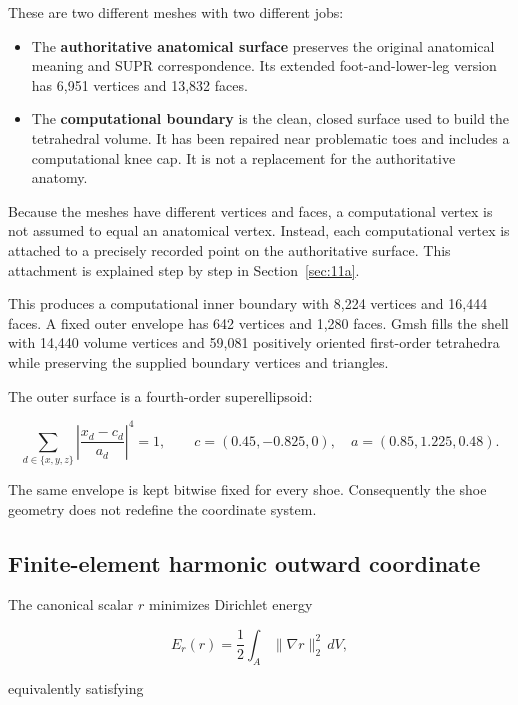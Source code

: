 \documentclass[11pt]{article}
\begin{document}
These are two different meshes with two different jobs:

\begin{itemize}
  \item The \textbf{authoritative anatomical surface} preserves the original anatomical
  meaning and SUPR correspondence. Its extended foot-and-lower-leg version has 6,951
  vertices and 13,832 faces.
  \item The \textbf{computational boundary} is the clean, closed surface used to build
  the tetrahedral volume. It has been repaired near problematic toes and includes a
  computational knee cap. It is not a replacement for the authoritative anatomy.
\end{itemize}

Because the meshes have different vertices and faces, a computational vertex is not
assumed to equal an anatomical vertex. Instead, each computational vertex is attached
to a precisely recorded point on the authoritative surface. This attachment is explained
step by step in Section~\ref{sec:11a}.

This produces a computational inner boundary with 8,224 vertices and 16,444 faces. A
fixed outer envelope has 642 vertices and 1,280 faces. Gmsh fills the shell with 14,440
volume vertices and 59,081 positively oriented first-order tetrahedra while preserving
the supplied boundary vertices and triangles.

The outer surface is a fourth-order superellipsoid:

\begin{equation}
  \sum_{d\in\{x,y,z\}}
  \left|\frac{x_d-c_d}{a_d}\right|^4=1,
  \qquad
  c=(0.45,-0.825,0),
  \quad a=(0.85,1.225,0.48).
  \label{eq:envelope}
\end{equation}

The same envelope is kept bitwise fixed for every shoe. Consequently the shoe geometry
does not redefine the coordinate system.

\subsection{Finite-element harmonic outward coordinate}

The canonical scalar $r$ minimizes Dirichlet energy

\begin{equation}
  E_r(r)=\frac12\int_A\|\nabla r\|_2^2\,dV,
\end{equation}

equivalently satisfying
\end{document}
